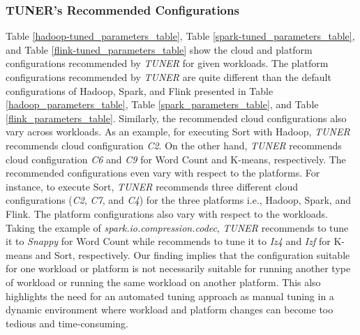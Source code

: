\documentclass[3p]{elsarticle}
\begin{document}
\subsubsection{TUNER's Recommended Configurations} Table \ref{hadoop-tuned_parameters_table}, Table \ref{spark-tuned_parameters_table}, and Table \ref{flink-tuned_parameters_table} show the cloud and platform configurations recommended by \textit{TUNER} for given workloads. The platform configurations recommended by \textit{TUNER} are quite different than the default configurations of Hadoop, Spark, and Flink presented in Table \ref{hadoop_parameters_table}, Table \ref{spark_parameters_table}, and Table \ref{flink_parameters_table}. Similarly, the recommended cloud configurations also vary across workloads. As an example, for executing Sort with Hadoop, \textit{TUNER} recommends cloud configuration \textit{C2}. On the other hand, \textit{TUNER} recommends cloud configuration \textit{C6} and \textit{C9} for Word Count and K-means, respectively. The recommended configurations even vary with respect to the platforms. For instance, to execute Sort, \textit{TUNER} recommends three different cloud configurations (\textit{C2}, \textit{C7}, and \textit{C4}) for the three platforms i.e., Hadoop, Spark, and Flink. The platform configurations also vary with respect to the workloads. Taking the example of \textit{spark.io.compression.codec}, \textit{TUNER} recommends to tune it to \textit{Snappy} for Word Count while recommends to tune it to \textit{Iz4} and \textit{Izf} for K-means and Sort, respectively. Our finding implies that the configuration suitable for one workload or platform is not necessarily suitable for running another type of workload or running the same workload on another platform. This also highlights the need for an automated tuning approach as manual tuning in a dynamic environment where workload and platform changes can become too tedious and time-consuming. 
\end{document}
